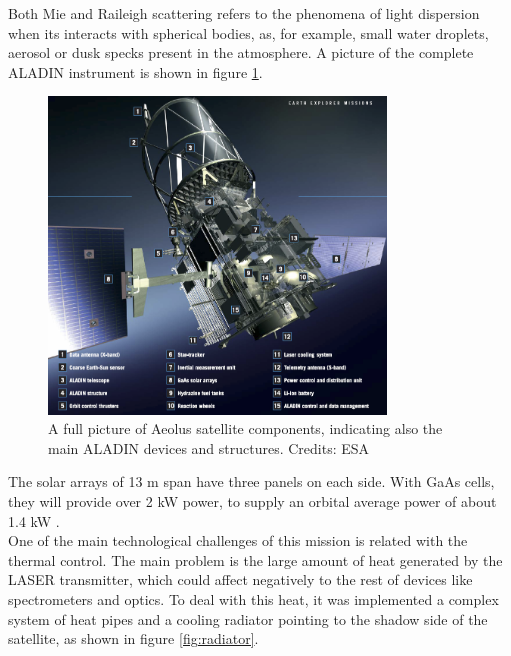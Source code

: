 Both Mie and Raileigh scattering refers to the phenomena of light dispersion when
its interacts with spherical bodies, as, for example, small water droplets, aerosol
or dusk specks present in the atmosphere. A picture of the complete ALADIN instrument
is shown in figure \ref{fig:full_payload}.\\

\begin{figure}[h]
	\centering
	\includegraphics[width=0.8\textwidth]{img/Aeolus_payload_components.png}
	\caption[ALADIN instrument components]{A full picture of Aeolus satellite
	components, indicating also the main ALADIN devices and structures. Credits: ESA \cite{full_payload}}
	\label{fig:full_payload}
\end{figure}

The solar arrays of 13 m span have three panels on each
side. With GaAs cells, they will provide over 2 kW power,
to supply an orbital average power of about 1.4 kW \cite{Endemann2004}.\\

One of the main technological challenges of this mission is related with the
thermal control. The main problem is the large amount of heat generated by the
LASER transmitter, which could affect negatively to the rest of devices like
spectrometers and optics. To deal with this heat, it was implemented a complex
system of heat pipes and a cooling radiator pointing to the shadow side of the
satellite, as shown in figure \ref{fig:radiator}.\\

